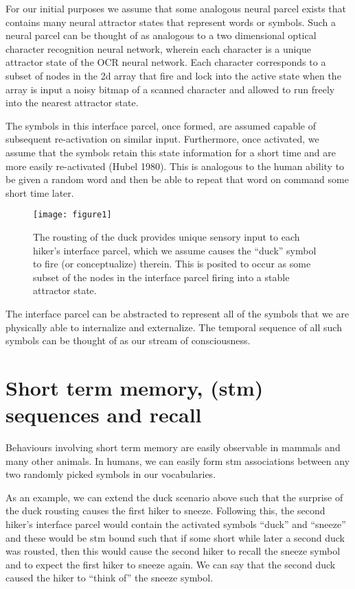 \documentclass{clv3}
\begin{document}
 

 For our initial purposes we assume that some analogous neural parcel exists  that contains many neural attractor states that represent words or symbols.  Such a neural parcel can be thought of as analogous to a two dimensional  optical character recognition neural network, wherein each character is a unique attractor state of the OCR neural network.   Each character corresponds to a subset of nodes in the 2d array that fire and lock into the active state when the array is input a noisy bitmap of a scanned character and allowed to run freely into the nearest attractor state.

The symbols in this interface parcel, once formed, are assumed capable of  subsequent re-activation on similar input.  Furthermore, once activated, we assume that the symbols retain this  state information for a short time and are more easily re-activated (Hubel 1980).  This is analogous to the human ability to be given a random word and then be able to repeat that word on command some short time later. 


 \begin{figure}
\texttt{[image: figure1]}
\caption{The rousting of the duck provides unique sensory input to each hiker’s interface parcel, which we assume causes the “duck” symbol to fire (or conceptualize) therein.  This is posited to occur as some subset of the nodes in the interface parcel firing into a stable attractor state.}
\end{figure}





The interface parcel can be abstracted to represent all of the symbols that we are physically able to internalize and externalize.   The temporal sequence of all such symbols can be thought of as our stream of consciousness.  


\section{Short term memory, (stm) sequences and recall}

Behaviours involving short term memory are easily observable in mammals and many other animals.  In humans, we can easily form stm associations between any two randomly picked symbols in our vocabularies.  

As an example, we can extend the duck scenario above such that the surprise  of the duck rousting causes the first hiker to sneeze.  Following this,  the second hiker’s interface parcel would contain the activated symbols “duck” and “sneeze” and these would be stm bound such that if some short while later a second duck was rousted, then this would cause the second hiker to recall the sneeze symbol and to expect the first hiker to sneeze again.  We can say that the second duck caused the hiker to “think of” the sneeze symbol.
\end{document}
